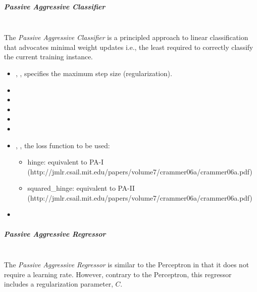 \subparagraph{Passive Aggressive Classifier}
\mbox{}
\\The \textit{Passive Aggressive Classifier} is a principled approach to linear
classification that advocates minimal weight updates i.e., the least required 
to correctly classify the current training instance.
%
\begin{itemize}
  \item {}, , specifies the maximum step size
  (regularization).
  \item {}
  \item {}
  \item {}
  \item {}
  \item \verDescriptionB{}
  \item {}, , the loss function to
  be used:
  \begin{itemize}
    \item hinge: equivalent to PA-I (http://jmlr.csail.mit.edu/papers/volume7/crammer06a/crammer06a.pdf)
    \item squared\_hinge: equivalent to PA-II (http://jmlr.csail.mit.edu/papers/volume7/crammer06a/crammer06a.pdf)
  \end{itemize}
 
  \item \warmStartDescription{}
\end{itemize}

\subparagraph{Passive Aggressive Regressor}
\mbox{}
\\The \textit{Passive Aggressive Regressor} is similar to the Perceptron in that
it does not require a learning rate.
%
However, contrary to the Perceptron, this regressor includes a regularization
parameter, $C$.

